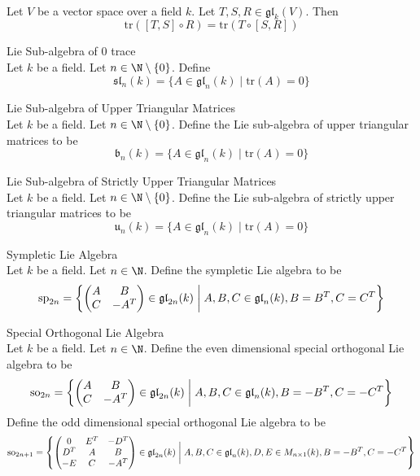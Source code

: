 \documentclass[a4paper]{article}
\begin{document}
\begin{lmm}{}{} \\Let $V$ be a vector space over a field $k$. Let $T,S,R\in\mathfrak{gl}_k(V)$. Then $$\text{tr}([T,S]\circ R)=\text{tr}(T\circ [S,R])$$
\end{lmm}

\begin{defn}{Lie Sub-algebra of 0 trace}{} \\Let $k$ be a field. Let $n\in\N\setminus\{0\}$. Define $$\mathfrak{sl}_n(k)=\{A\in\mathfrak{gl}_n(k)\;|\;\text{tr}(A)=0\}$$
\end{defn}

\begin{defn}{Lie Sub-algebra of Upper Triangular Matrices}{} \\Let $k$ be a field. Let $n\in\N\setminus\{0\}$. Define the Lie sub-algebra of upper triangular matrices to be $$\mathfrak{b}_n(k)=\{A\in\mathfrak{gl}_n(k)\;|\;\text{tr}(A)=0\}$$
\end{defn}

\begin{defn}{Lie Sub-algebra of Strictly Upper Triangular Matrices}{} \\Let $k$ be a field. Let $n\in\N\setminus\{0\}$. Define the Lie sub-algebra of strictly upper triangular matrices to be $$\mathfrak{u}_n(k)=\{A\in\mathfrak{gl}_n(k)\;|\;\text{tr}(A)=0\}$$
\end{defn}

\begin{defn}{Sympletic Lie Algebra}{} \\Let $k$ be a field. Let $n\in\N$. Define the sympletic Lie algebra to be $$\text{sp}_{2n}=\left\{
\begin{pmatrix}
A & B\\
C & -A^T
\end{pmatrix}\in\mathfrak{gl}_{2n}(k)\;\bigg{|}\;A,B,C\in\mathfrak{gl}_n(k), B=B^T, C=C^T\right\}$$
\end{defn}

\begin{defn}{Special Orthogonal Lie Algebra}{} \\Let $k$ be a field. Let $n\in\N$. Define the even dimensional special orthogonal Lie algebra to be $$\text{so}_{2n}=\left\{
\begin{pmatrix}
A & B\\
C & -A^T
\end{pmatrix}\in\mathfrak{gl}_{2n}(k)\;\bigg{|}\;A,B,C\in\mathfrak{gl}_n(k), B=-B^T, C=-C^T\right\}$$ Define the odd dimensional special orthogonal Lie algebra to be $$\text{so}_{2n+1}=\left\{
\begin{pmatrix}
0 & E^T & -D^T\\
D^T & A & B\\
-E & C & -A^T
\end{pmatrix}\in\mathfrak{gl}_{2n}(k)\;\bigg{|}\;A,B,C\in\mathfrak{gl}_n(k), D,E\in M_{n\times 1}(k), B=-B^T, C=-C^T\right\}$$
\end{defn}
\end{document}
